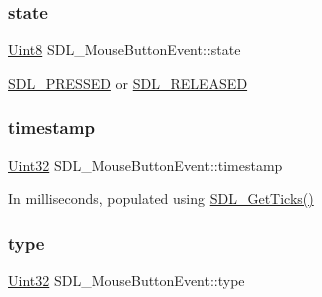 \mbox{\label{struct_s_d_l___mouse_button_event_a8809cef85cfffad4f2059f2ba4fc6a3d}} 
\subsubsection{\texorpdfstring{state}{state}}
{\footnotesize\ttfamily \mbox{\hyperlink{_s_d_l__stdinc_8h_a2944638813a090aa23e62f4da842c3e2}{Uint8}} S\+D\+L\+\_\+\+Mouse\+Button\+Event\+::state}

\mbox{\hyperlink{_s_d_l__events_8h_aee81bbffbc8489bdea8fecd1232c4bd1}{S\+D\+L\+\_\+\+P\+R\+E\+S\+S\+ED}} or \mbox{\hyperlink{_s_d_l__events_8h_ad680a069f9fcab80de91b3eefdf29c3c}{S\+D\+L\+\_\+\+R\+E\+L\+E\+A\+S\+ED}} \mbox{\label{struct_s_d_l___mouse_button_event_ab05e8a454692608ff56c502e95799c56}} 
\subsubsection{\texorpdfstring{timestamp}{timestamp}}
{\footnotesize\ttfamily \mbox{\hyperlink{_s_d_l__stdinc_8h_add440eff171ea5f55cb00c4a9ab8672d}{Uint32}} S\+D\+L\+\_\+\+Mouse\+Button\+Event\+::timestamp}

In milliseconds, populated using \mbox{\hyperlink{_s_d_l__timer_8h_a0b9bc71d6287e0ffafdc3419760fe2b3}{S\+D\+L\+\_\+\+Get\+Ticks()}} \mbox{\label{struct_s_d_l___mouse_button_event_af64cb09ea68b8081ecc8ee498552e3d7}} 
\subsubsection{\texorpdfstring{type}{type}}
{\footnotesize\ttfamily \mbox{\hyperlink{_s_d_l__stdinc_8h_add440eff171ea5f55cb00c4a9ab8672d}{Uint32}} S\+D\+L\+\_\+\+Mouse\+Button\+Event\+::type}

